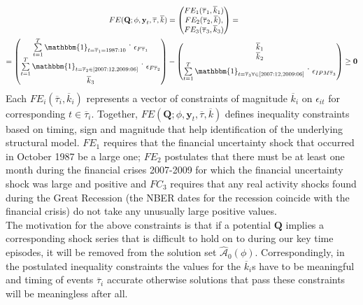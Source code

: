 \documentclass[a4paper,11pt,listof=nochaptergap,oneside,pointednumbers,bibtotoc,bigheadings,liststotoc]{scrbook}
\theoremstyle{mysatz}
\theoremstyle{mydefinition}
\theoremstyle{mybemerkung}
\let\oldhat\hat
\newcommand{\vect}[1]{\boldsymbol{\mathbf{#1}}}
\newcommand{\hatt}[1]{\oldhat{\boldsymbol{\mathbf{#1}}}}
\begin{document}
\begin{itemize}
\begin{equation} \label{eq:svar_ludvi12}
\begin{split}
	FE(\vect{Q}; \phi, \vect{y}_t, \overline{\tau}, \overline{k}) & = \begin{pmatrix}
	FE_1(\overline{\tau}_1, \overline{k}_1)\\
	 FE_2(\overline{\tau}_2, \overline{k}), \\
	 FE_3(\overline{\tau}_3, \overline{k}_3)
	\end{pmatrix} = \\
	= \begin{pmatrix}
	\sum\limits_{t=1}^T \mathbbm{1}_{t = \overline{\tau}_1= 1987:10} \dot \quad \epsilon_{F\overline{\tau}_1}  \\
	 \sum\limits_{t=1}^T \mathbbm{1}_{t = \overline{\tau}_2 \in [2007:12, 2009:06]} \dot \quad \epsilon_{F\overline{\tau}_2}  \\
	\overline{k}_3
	\end{pmatrix} & - 
	\begin{pmatrix}
	\overline{k}_1\\
	\overline{k}_2  \\
	\sum\limits_{t=1}^T \mathbbm{1}_{t = \overline{\tau}_3 \forall \in [2007:12, 2009:06]} \dot \quad \epsilon_{IPM\overline{\tau}_3} 
	\end{pmatrix} \geq \vect{0}
\end{split}								
\end{equation}
Each $FE_i(\overline{\tau}_i, \overline{k}_i)$ represents a vector of constraints of magnitude $\overline{k}_i$ on $\epsilon_{it}$ for corresponding $t \in \overline{\tau}_i$. Together, $FE(\vect{Q}; \phi, \vect{y}_t, \overline{\tau}, \overline{k})$ defines inequality constraints based on timing, sign and magnitude that help identification of the underlying structural model. $FE_1$ requires that the financial uncertainty shock that occurred in October 1987 be a large one; $FE_2$ postulates that there must be at least one month during the financial crises 2007-2009 for which the financial uncertainty shock was large and positive and $FC_3$ requires that any real activity shocks found during the Great Recession (the NBER dates for the recession coincide with the financial crisis) do not take any unusually large positive values.\\
The motivation for the above constraints is that if a potential $\vect{Q}$ implies a corresponding shock series that is difficult to hold on to during our key time episodes, it will be removed from the solution set $\hatt{\mathcal{A}}_0(\phi)$. Correspondingly, in the postulated inequality constraints the values for the $\overline{k}_i$s have to be meaningful and timing of events $\overline{\tau}_i$ accurate otherwise solutions that pass these constraints will be meaningless after all.

\end{itemize}
\end{document}
